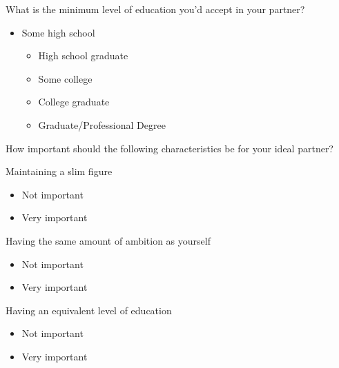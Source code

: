 \begin{multicols}{2}
 What is the minimum level of education you'd accept in your partner?

 \begin{itemize}
  \item
        Some high school

        \begin{itemize}
         \item
               High school graduate
        \end{itemize}

        \begin{itemize}
         \item
               Some college
         \item
               College graduate
         \item
               Graduate/Professional Degree
        \end{itemize}
 \end{itemize}

 How important should the following characteristics be for your ideal partner?

 Maintaining a slim figure

 \begin{itemize}
  \item
        Not important
 \end{itemize}

 \begin{itemize}
  \item
        Very important
 \end{itemize}

 Having the same amount of ambition as yourself

 \begin{itemize}
  \item
        Not important
 \end{itemize}

 \begin{itemize}
  \item
        Very important
 \end{itemize}

 Having an equivalent level of education

 \begin{itemize}
  \item
        Not important
 \end{itemize}

 \begin{itemize}
  \item
        Very important
 \end{itemize}


\end{multicols}
